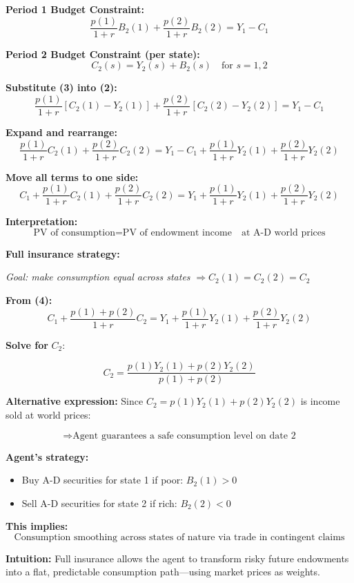 \documentclass[12pt]{article}
\begin{document}
{\color{blue}
\textbf{Period 1 Budget Constraint:}
\[
\frac{p(1)}{1 + r} B_2(1) + \frac{p(2)}{1 + r} B_2(2) = Y_1 - C_1 \tag{2}
\]

\textbf{Period 2 Budget Constraint (per state):}
\[
C_2(s) = Y_2(s) + B_2(s) \quad \text{for } s = 1, 2 \tag{3}
\]

\textbf{Substitute (3) into (2):}
\[
\frac{p(1)}{1 + r} [C_2(1) - Y_2(1)] + \frac{p(2)}{1 + r} [C_2(2) - Y_2(2)] = Y_1 - C_1
\]

\textbf{Expand and rearrange:}
\[
\frac{p(1)}{1 + r} C_2(1) + \frac{p(2)}{1 + r} C_2(2) = Y_1 - C_1 + \frac{p(1)}{1 + r} Y_2(1) + \frac{p(2)}{1 + r} Y_2(2)
\]

\textbf{Move all terms to one side:}
\[
C_1 + \frac{p(1)}{1 + r} C_2(1) + \frac{p(2)}{1 + r} C_2(2) = Y_1 + \frac{p(1)}{1 + r} Y_2(1) + \frac{p(2)}{1 + r} Y_2(2) \tag{4}
\]

\textbf{Interpretation:}
\[
\text{PV of consumption} = \text{PV of endowment income} \quad \text{at A-D world prices}
\]

\vspace{0.3cm}

\textbf{Full insurance strategy:}

\textit{Goal: make consumption equal across states} $\Rightarrow C_2(1) = C_2(2) = C_2$

\textbf{From (4):}
\[
C_1 + \frac{p(1) + p(2)}{1 + r} C_2 = Y_1 + \frac{p(1)}{1 + r} Y_2(1) + \frac{p(2)}{1 + r} Y_2(2)
\]

\textbf{Solve for } \( C_2 \):

\[
C_2 = \frac{p(1)Y_2(1) + p(2)Y_2(2)}{p(1) + p(2)}
\]

\textbf{Alternative expression:}  
Since $C_2 = p(1)Y_2(1) + p(2)Y_2(2)$ is income sold at world prices:

\[
\Rightarrow \text{Agent guarantees a safe consumption level on date 2} \tag{5}
\]

\textbf{Agent’s strategy:}
\begin{itemize}
\item Buy A-D securities for state 1 if poor: $B_2(1) > 0$
\item Sell A-D securities for state 2 if rich: $B_2(2) < 0$
\end{itemize}

\textbf{This implies:}
\[
\text{Consumption smoothing across states of nature via trade in contingent claims}
\]

\vspace{0.3cm}

\textbf{Intuition:}  
Full insurance allows the agent to transform risky future endowments into a flat, predictable consumption path—using market prices as weights.
}
\end{document}
